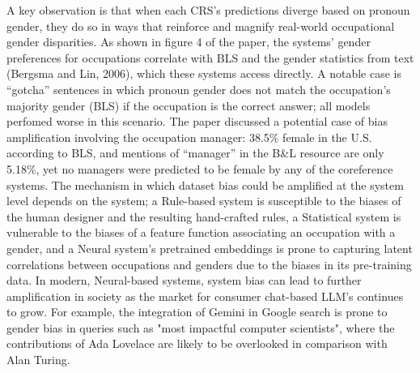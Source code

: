 \documentclass[12pt]{article}
\begin{document}
A key observation is that when each CRS's predictions diverge based
on pronoun gender, they do so in ways that reinforce and magnify real-world 
occupational gender disparities. As shown in figure 4 of the paper, the systems' gender
preferences for occupations correlate with BLS
and the gender statistics from text (Bergsma and Lin, 2006), which these systems access directly. 
A notable case is “gotcha” sentences in which pronoun gender does not match the occupation's 
majority gender (BLS) if the occupation is the correct answer; all models perfomed worse in this scenario. 
The paper discussed a potential case of bias amplification involving the occupation manager: 
38.5\% female in the U.S. according to BLS, and mentions of
“manager” in the B\&L resource are only 5.18\%, yet no managers 
were predicted to be female by any of the coreference systems.
The mechanism in which dataset bias could be amplified at the system level depends on the system;
a Rule-based system is susceptible to the biases of the human designer and the resulting hand-crafted rules,
a Statistical system is vulnerable to the biases of a feature function associating an occupation with a gender,
and a Neural system's pretrained embeddings is prone to capturing latent correlations between occupations and genders
due to the biases in its pre-training data. In modern, Neural-based systems, system bias can
lead to further amplification in society as the market for consumer chat-based LLM's continues to grow. For example,
the integration of Gemini in Google search is prone to gender bias in queries such as "most impactful computer scientists", 
where the contributions of Ada Lovelace are likely to be overlooked in comparison with Alan Turing.


\end{document}
